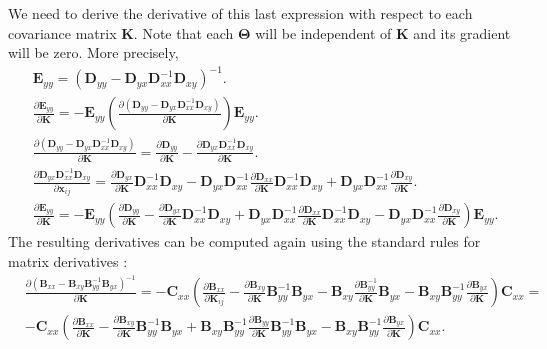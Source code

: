 We need to derive the derivative of this last expression with respect to each covariance matrix $\mathbf{K}$. Note that each $\mathbf{\Theta}$ will be independent of $\mathbf{K}$ and its gradient will be zero.
More precisely,
\begin{align}
& \mathbf{E}_{yy} = (\mathbf{D}_{yy}-\mathbf{D}_{yx}\mathbf{D}_{xx}^{-1}\mathbf{D}_{xy})^{-1}. \\
& \frac{\partial \mathbf{E}_{yy}}{\partial \mathbf{K}} = - \mathbf{E}_{yy} ( \frac{\partial (\mathbf{D}_{yy}-\mathbf{D}_{yx}\mathbf{D}_{xx}^{-1}\mathbf{D}_{xy})} {\partial \mathbf{K}}) \mathbf{E}_{yy}. \\
& \frac{\partial (\mathbf{D}_{yy}-\mathbf{D}_{yx}\mathbf{D}_{xx}^{-1}\mathbf{D}_{xy})} {\partial \mathbf{K}} = \frac{\partial \mathbf{D}_{yy}}{\partial \mathbf{K}} - \frac{\partial \mathbf{D}_{yx}\mathbf{D}_{xx}^{-1}\mathbf{D}_{xy}}{\partial \mathbf{K}}. \\
& \frac{\partial \mathbf{D}_{yx}\mathbf{D}_{xx}^{-1}\mathbf{D}_{xy}}{\partial \mathbf{x}_{ij}} = \frac{\partial \mathbf{D}_{yx}}{\partial \mathbf{K}} \mathbf{D}_{xx}^{-1}\mathbf{D}_{xy} - \mathbf{D}_{yx} \mathbf{D}_{xx}^{-1} \frac{\partial \mathbf{D}_{xx}}{\partial \mathbf{K}}\mathbf{D}_{xx}^{-1}\mathbf{D}_{xy}+ \mathbf{D}_{yx}\mathbf{D}_{xx}^{-1}\frac{\partial \mathbf{D}_{xy}}{\partial \mathbf{K}}. \\
& \frac{\partial \mathbf{E}_{yy}}{\partial \mathbf{K}} = - \mathbf{E}_{yy} (\frac{\partial \mathbf{D}_{yy}}{\partial \mathbf{K}} - \frac{\partial \mathbf{D}_{yx}}{\partial \mathbf{K}} \mathbf{D}_{xx}^{-1}\mathbf{D}_{xy} + \mathbf{D}_{yx} \mathbf{D}_{xx}^{-1} \frac{\partial \mathbf{D}_{xx}}{\partial \mathbf{K}}\mathbf{D}_{xx}^{-1}\mathbf{D}_{xy} - \mathbf{D}_{yx}\mathbf{D}_{xx}^{-1}\frac{\partial \mathbf{D}_{xy}}{\partial \mathbf{K}}) \mathbf{E}_{yy}.
\end{align}
The resulting derivatives can be computed again using the standard rules for matrix derivatives \cite{petersen2012}:
\begin{align}
& \frac{\partial (\mathbf{B}_{xx}-\mathbf{B}_{xy}\mathbf{B}_{yy}^{-1}\mathbf{B}_{yx})^{-1}}{\partial \mathbf{K}} =  -\mathbf{C}_{xx}(\frac{\partial \mathbf{B}_{xx}}{\partial \mathbf{K}_{ij}} - \frac{\partial \mathbf{B}_{xy}}{\partial \mathbf{K}}\mathbf{B}_{yy}^{-1}\mathbf{B}_{yx} - \mathbf{B}_{xy}\frac{\partial \mathbf{B}_{yy}^{-1}}{\partial \mathbf{K}}\mathbf{B}_{yx} - \mathbf{B}_{xy}\mathbf{B}_{yy}^{-1}\frac{\partial \mathbf{B}_{yx}}{\partial \mathbf{K}})\mathbf{C}_{xx} = \nonumber \\
& -\mathbf{C}_{xx}(\frac{\partial \mathbf{B}_{xx}}{\partial \mathbf{K}} - \frac{\partial \mathbf{B}_{xy}}{\partial \mathbf{K}}\mathbf{B}_{yy}^{-1}\mathbf{B}_{yx} + \mathbf{B}_{xy}\mathbf{B}_{yy}^{-1} \frac{\partial \mathbf{B}_{yy}}{\partial \mathbf{K}} \mathbf{B}_{yy}^{-1}\mathbf{B}_{yx} - \mathbf{B}_{xy}\mathbf{B}_{yy}^{-1}\frac{\partial \mathbf{B}_{yx}}{\partial \mathbf{K}})\mathbf{C}_{xx} .
\end{align}
